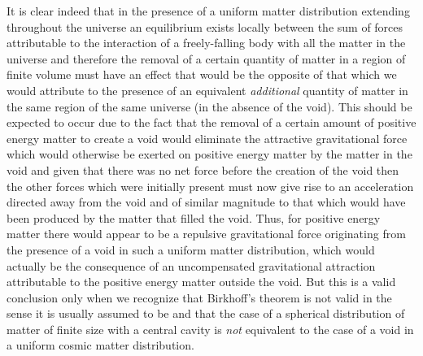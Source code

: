 \documentclass[notitlepage,12pt]{report}
\begin{document}
It is clear indeed that in the presence of a uniform matter distribution extending throughout the universe an equilibrium exists locally between the sum of forces attributable to the interaction of a freely-falling body with all the matter in the universe and therefore the removal of a certain quantity of matter in a region of finite volume must have an effect that would be the opposite of that which we would attribute to the presence of an equivalent \textit{additional} quantity of matter in the same region of the same universe (in the absence of the void). This should be expected to occur due to the fact that the removal of a certain amount of positive energy matter to create a void would eliminate the attractive gravitational force which would otherwise be exerted on positive energy matter by the matter in the void and given that there was no net force before the creation of the void then the other forces which were initially present must now give rise to an acceleration directed away from the void and of similar magnitude to that which would have been produced by the matter that filled the void. Thus, for positive energy matter there would appear to be a repulsive gravitational force originating from the presence of a void in such a uniform matter distribution, which would actually be the consequence of an uncompensated gravitational attraction attributable to the positive energy matter outside the void. But this is a valid conclusion only when we recognize that Birkhoff's theorem is not valid in the sense it is usually assumed to be and that the case of a spherical distribution of matter of finite size with a central cavity is \textit{not} equivalent to the case of a void in a uniform cosmic matter distribution.
\end{document}
